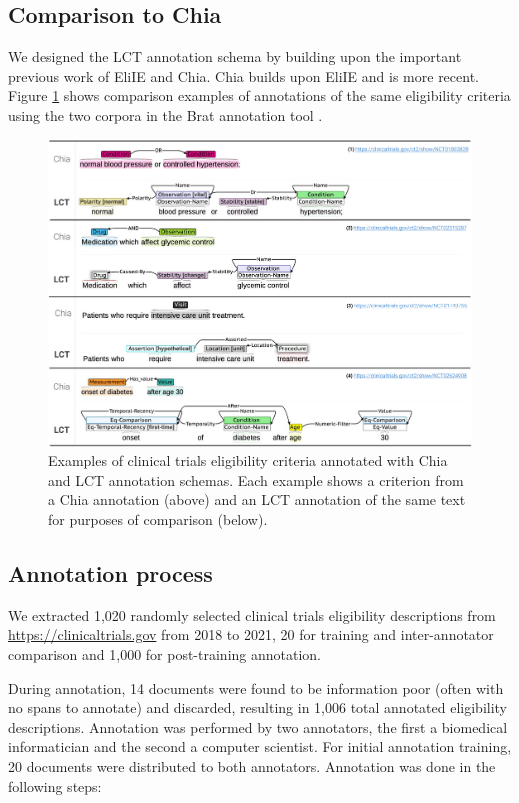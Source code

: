 \documentclass[../main.tex]{subfiles}
\begin{document}
\subsection{Comparison to Chia}

We designed the LCT annotation schema by building upon the important previous work of EliIE and Chia. Chia builds upon EliIE and is more recent. Figure \ref{fig_chia_vs_lct} shows comparison examples of annotations of the same eligibility criteria using the two corpora in the Brat annotation tool \cite{stenetorp2012brat}. \\

\begin{figure}[h!]
  \includegraphics[scale=0.52]{Figures/3_lct_corpus/chia_vs_lct.pdf}  
    \caption{Examples of clinical trials eligibility criteria annotated with Chia and LCT annotation schemas. Each example shows a criterion from a Chia annotation (above) and an LCT annotation of the same text for purposes of comparison (below).}
\label{fig_chia_vs_lct}
\end{figure}

\subsection{Annotation process}

We extracted 1,020 randomly selected clinical trials eligibility descriptions from \url{https://clinicaltrials.gov} from 2018 to 2021, 20 for training and inter-annotator comparison and 1,000 for post-training annotation. 

During annotation, 14 documents were found to be information poor (often with no spans to annotate) and discarded, resulting in 1,006 total annotated eligibility descriptions. Annotation was performed by two annotators, the first a biomedical informatician and the second a computer scientist. For initial annotation training, 20 documents were distributed to both annotators. Annotation was done in the following steps:
\end{document}
